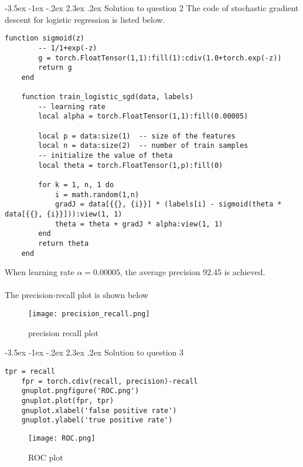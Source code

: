 \documentclass[12pt]{article}
\makeatletter
\renewcommand\section{\@startsection {section}{1}{\z@}%
	{-3.5ex \@plus -1ex \@minus -.2ex}%
	{2.3ex \@plus.2ex}%
	{\normalfont\large\bfseries}}%
\makeatother
\begin{document}
	\section{Solution to question 2}
	The code of stochastic gradient descent for logistic regression is listed below.\\
	\lstset{language=R}
	\lstset{frame=lines}
	\lstset{basicstyle=\footnotesize\ttfamily}
	\begin{lstlisting}[breaklines=true]
	function sigmoid(z)
		-- 1/1+exp(-z)
		g = torch.FloatTensor(1,1):fill(1):cdiv(1.0+torch.exp(-z))
		return g
	end
	
	function train_logistic_sgd(data, labels)
		-- learning rate
		local alpha = torch.FloatTensor(1,1):fill(0.00005)
	
		local p = data:size(1)  -- size of the features
		local n = data:size(2)  -- number of train samples
		-- initialize the value of theta
		local theta = torch.FloatTensor(1,p):fill(0)
	
		for k = 1, n, 1 do
			i = math.random(1,n)
			gradJ = data[{{}, {i}}] * (labels[i] - sigmoid(theta * data[{{}, {i}}])):view(1, 1)
			theta = theta + gradJ * alpha:view(1, 1)
		end
		return theta
	end
	\end{lstlisting}
	\noindent
	When learning rate $\alpha = 0.00005$, the average precision 92.45 is achieved.\\
	\\
	\noindent
	The precision-recall plot is shown below\\
	\begin{figure}[htpb]
		\centering
		\texttt{[image: precision\_recall.png]}
		\caption{precision recall plot}
	\end{figure}
	\section{Solution to question 3}
	\begin{lstlisting}[breaklines=true]
	tpr = recall
	fpr = torch.cdiv(recall, precision)-recall
	gnuplot.pngfigure('ROC.png')
	gnuplot.plot(fpr, tpr)
	gnuplot.xlabel('false positive rate')
	gnuplot.ylabel('true positive rate')
	\end{lstlisting}
	\begin{figure}[htpb]
		\centering
		\texttt{[image: ROC.png]}
		\caption{ROC plot}
	\end{figure}

	

	
	
\end{document}
